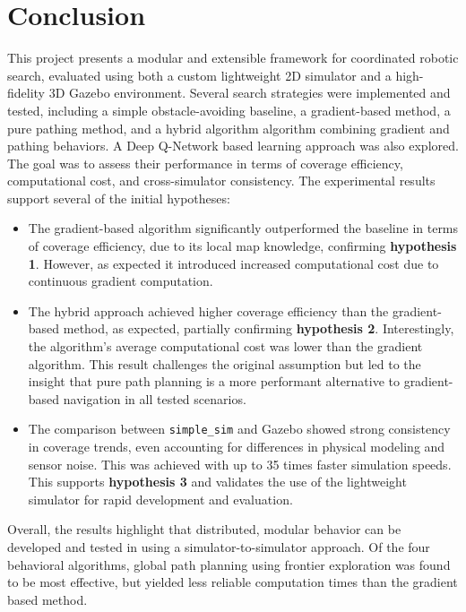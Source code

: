 \section{Conclusion}
\label{sec:Conclusion}
This project presents a modular and extensible framework for coordinated robotic search, evaluated using both a custom lightweight 2D simulator and a high-fidelity 3D Gazebo environment. Several search strategies were implemented and tested, including a simple obstacle-avoiding baseline, a gradient-based method, a pure pathing method, and a hybrid algorithm algorithm combining gradient and pathing behaviors. A Deep Q-Network based learning approach was also explored. The goal was to assess their performance in terms of coverage efficiency, computational cost, and cross-simulator consistency. The experimental results support several of the initial hypotheses:

\begin{itemize}
    \item The gradient-based algorithm significantly outperformed the baseline in terms of coverage efficiency, due to its local map knowledge, confirming \textbf{hypothesis 1}. However, as expected it introduced increased computational cost due to continuous gradient computation.

    \item The hybrid approach achieved higher coverage efficiency than the gradient-based method, as expected, partially confirming \textbf{hypothesis 2}. Interestingly, the algorithm's average computational cost was lower than the gradient algorithm. This result challenges the original assumption but led to the insight that pure path planning is a more performant alternative to gradient-based navigation in all tested scenarios.

    \item The comparison between \texttt{simple\_sim} and Gazebo showed strong consistency in coverage trends, even accounting for differences in physical modeling and sensor noise. This was achieved with up to 35 times faster simulation speeds. This supports \textbf{hypothesis 3} and validates the use of the lightweight simulator for rapid development and evaluation.

\end{itemize}
Overall, the results highlight that distributed, modular behavior can be developed and tested in using a simulator-to-simulator approach. Of the four behavioral algorithms, global path planning using frontier exploration was found to be most effective, but yielded less reliable computation times than the gradient based method.
